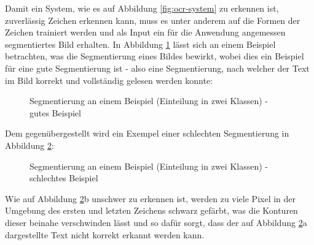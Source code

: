 		Damit ein System, wie es auf Abbildung \ref{fig:ocr-system} zu 
		erkennen ist, zuverlässig Zeichen erkennen kann, muss es unter 
		anderem auf die Formen der Zeichen trainiert werden und als Input ein für 
		die Anwendung angemessen segmentiertes Bild erhalten. In Abbildung \ref{fig:seg-example-good} lässt sich an einem Beispiel betrachten, was die Segmentierung eines Bildes bewirkt, wobei dies ein Beispiel für eine gute Segmentierung ist - also eine Segmentierung, nach welcher der Text im Bild korrekt und vollständig gelesen werden konnte:
		\begin{figure}[H]
			\centering
			\qquad
			\caption{Segmentierung an einem Beispiel (Einteilung in zwei Klassen) - gutes Beispiel}
			\label{fig:seg-example-good}
		\end{figure}
		Dem gegenübergestellt wird ein Exempel einer schlechten Segmentierung in Abbildung \ref{fig:seg-example-bad}:
		\begin{figure}[H]
			\centering
			\qquad
			\caption{Segmentierung an einem Beispiel (Einteilung in zwei Klassen) - schlechtes Beispiel}
			\label{fig:seg-example-bad}
		\end{figure}
		Wie auf Abbildung \ref{fig:seg-example-bad}b unschwer zu erkennen ist, werden zu viele Pixel in der Umgebung des ersten und letzten Zeichens schwarz gefärbt, was die Konturen dieser beinahe verschwinden lässt und so dafür sorgt, dass der auf Abbildung \ref{fig:seg-example-bad}a dargestellte Text nicht korrekt erkannt werden kann.\\
